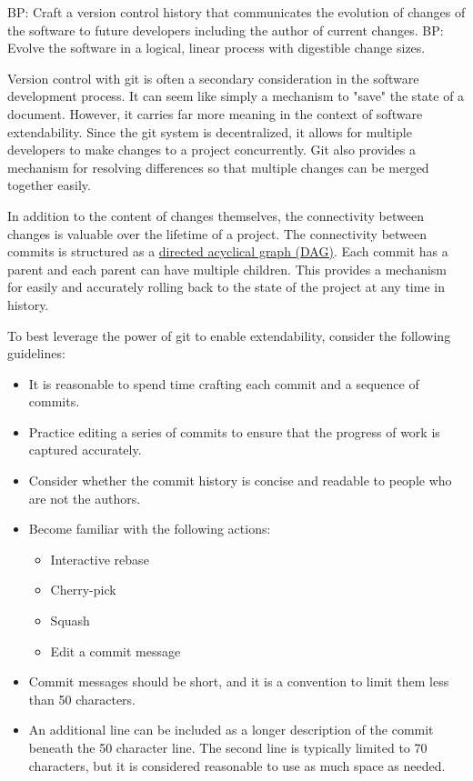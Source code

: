 \documentclass[]{nrel}
\begin{document}
BP: Craft a version control history that communicates the evolution of changes of the software
to future developers including the author of current changes.
BP: Evolve the software in a logical, linear process with digestible change sizes.

Version control with git is often a secondary consideration in the software development process.
It can seem like simply a mechanism to "save" the state of a document.
However, it carries far more meaning in the context of software extendability.
Since the git system is decentralized, it allows for multiple developers to make changes to a
project concurrently.
Git also provides a mechanism for resolving differences so that multiple changes can be merged
together easily.

In addition to the content of changes themselves, the connectivity between changes is valuable
over the lifetime of a project.
The connectivity between commits is structured as a
\href{https://en.wikipedia.org/wiki/Directed\_acyclic\_graph}{directed acyclical graph (DAG)}.
Each commit has a parent and each parent can have multiple children.
This provides a mechanism for easily and accurately rolling back to the state of the project at any
time in history.

To best leverage the power of git to enable extendability, consider the following guidelines:
\begin{itemize}
\item It is reasonable to spend time crafting each commit and a sequence of commits.

\item Practice editing a series of commits to ensure that the progress of work is captured accurately.

\item Consider whether the commit history is concise and readable to people who are not the authors.

\item Become familiar with the following actions:
\begin{itemize}
\item Interactive rebase

\item Cherry-pick

\item Squash

\item Edit a commit message

\end{itemize}

\item Commit messages should be short, and it is a convention to limit them less than 50 characters.

\item An additional line can be included as a longer description of the commit beneath the
50 character line. The second line is typically limited to 70 characters, but it is
considered reasonable to use as much space as needed.

\end{itemize}
\end{document}
